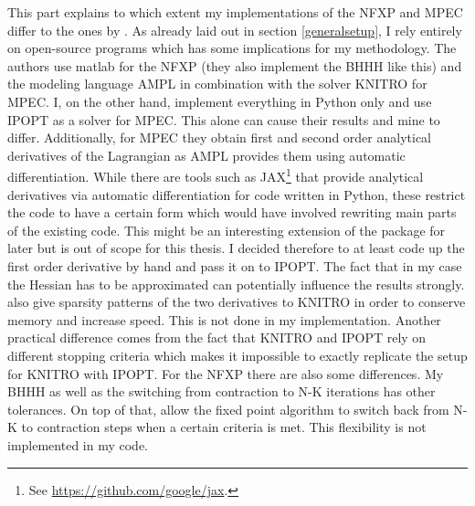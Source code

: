 This part explains to which extent my implementations of the NFXP and MPEC differ to the ones by \cite{Iskhakov.2016}. As already laid out in section \ref{generalsetup}, I rely entirely on open-source programs which has some implications for my methodology. The authors use matlab for the NFXP (they also implement the BHHH like this) and the modeling language AMPL in combination with the solver KNITRO for MPEC. I, on the other hand, implement everything in Python only and use IPOPT as a solver for MPEC. This alone can cause their results and mine to differ. Additionally, for MPEC they obtain first and second order analytical derivatives of the Lagrangian as AMPL provides them using automatic differentiation. While there are tools such as JAX\footnote{ See \url{https://github.com/google/jax}.} that provide analytical derivatives via automatic differentiation for code written in Python, these restrict the code to have a certain form which would have involved rewriting main parts of the existing code. This might be an interesting extension of the package for later but is out of scope for this thesis. I decided therefore to at least code up the first order derivative by hand and pass it on to IPOPT. The fact that in my case the Hessian has to be approximated can potentially influence the results strongly. \citeauthor{Iskhakov.2016} also give sparsity patterns of the two derivatives to KNITRO in order to conserve memory and increase speed. This is not done in my implementation. Another practical difference comes from the fact that KNITRO and IPOPT rely on different stopping criteria which makes it impossible to exactly replicate the setup for KNITRO with IPOPT. For the NFXP there are also some differences. My BHHH as well as the switching from contraction to N-K iterations has other tolerances. On top of that, \citeauthor{Iskhakov.2016} allow the fixed point algorithm to switch back from N-K to contraction steps when a certain criteria is met. This flexibility is not implemented in my code.

